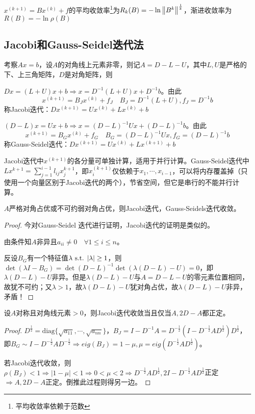 \documentclass{ctexart}
\begin{document}
\begin{Def}[收敛率]
$x^{(k+1)}=Bx^{(k)}+f$的平均收敛率\footnote{平均收敛率依赖于范数}为$R_k(B)=-\ln\left\|B^k \right\|^{\frac 1 k}$，渐进收敛率为$R(B)=-\ln\rho(B)$
\end{Def}

\subsection{Jacobi和Gauss-Seidel迭代法}
考察$Ax=b$，设$A$的对角线上元素非零，则记$A=D-L-U$，其中$L,U$是严格的下、上三角矩阵，$D$是对角矩阵，则

$Dx=(L+U)x+b\Rightarrow x=D^{-1}(L+U)x+D^{-1}b$。由此
\[x^{(k+1)}=B_Jx^{(k)}+f_J\quad B_J=D^{-1}(L+U), f_J=D^{-1}b\]
称Jacobi迭代：$Dx^{(k+1)}=Ux^{(k)}+Lx^{(k)}+b$

$(D-L)x=Ux+b\Rightarrow x=(D-L)^{-1}Ux+(D-L)^{-1}b$。由此
\[x^{(k+1)}=B_Gx^{(k)}+f_G\quad B_G=(D-L)^{-1}Ux, f_G=(D-L)^{-1}b\]
称Gauss-Seidel迭代：$Dx^{(k+1)}=Ux^{(k)}+Lx^{(k+1)}+b$

Jacobi迭代中$x^{(k+1)}$的各分量可单独计算，适用于并行计算。Gauss-Seidel迭代中$Lx^{k+1}=\sum\limits_{j=1}^{i-1}l_{ij}x_j^{k+1}$，即$x^{(k+1)}_i$仅依赖于$x_1,\cdots, x_{i-1}$，可以将内存覆盖掉（只使用一个向量区别于Jacobi迭代的两个），节省空间，但它是串行的不能并行计算。

\begin{Thm}
$A$严格对角占优或不可约弱对角占优，则Jacobi迭代，Gauss-Seidels迭代收敛。
\end{Thm}
\begin{proof}
今对Gauss-Seidel 迭代进行证明，Jacobi迭代的证明是类似的。

由条件知$A$非异且$a_{ii}\neq 0\quad \forall 1\leq i\leq n$。

反设$B_G$有一个特征值$\lambda\text{ s.t. } |\lambda|\geq 1$，则$\det(\lambda I-B_G)=\det{(D-L)}^{-1}\det(\lambda(D-L)-U)=0$，即$\lambda(D-L)-U$非异。但是$\lambda(D-L)-U$与$A=D-L-U$的零元素位置相同，故犹不可约；又$\lambda>1$，故$\lambda(D-L)-U$犹对角占优，故$\lambda(D-L)-U$非异，矛盾！
\end{proof}

\begin{Thm}
设$A$对称且对角线元素$>0$，则Jacobi迭代收敛当且仅当$A,2D-A$都正定。
\end{Thm}

\begin{proof}
$D^{\frac 1 2}=\mathrm{diag}\{\sqrt{a_{11}},\cdots,\sqrt{a_{nn}}\}$，$B_J=I-D^{-1}A=D^{-\frac 1 2}(I-D^{-\frac 1 2}AD^{\frac 1 2})D^{\frac 1 2}$，即$B_G\sim I-D^{-\frac 1 2}AD^{-\frac 1 2}\Rightarrow eig(B_J)=1-\mu,\mu=eig(D^{-\frac 1 2}AD^{\frac 1 2})$。

若Jacobi迭代收敛，则$\rho(B_J)<1\Rightarrow |1-\mu|<1\Rightarrow 0<\mu<2\Rightarrow D^{-\frac 1 2}AD^{\frac 1 2},2I-D^{-\frac 1 2}AD^{\frac 1 2}$正定$\Rightarrow A,2D-A$正定。倒推此过程则得另一边。
\end{proof}
\end{document}
